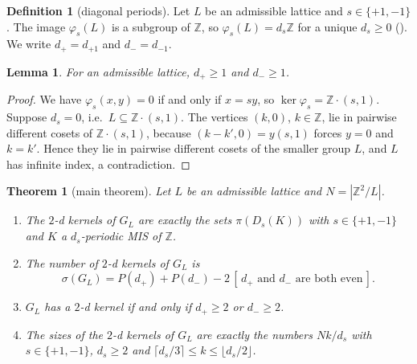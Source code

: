 \documentclass[11pt]{article}
\theoremstyle{plain}
\newtheorem{theorem}{Theorem}[section]
\newtheorem{lemma}[lemma]{Lemma}
\theoremstyle{definition}
\newtheorem{definition}[definition]{Definition}
\theoremstyle{remark}
\newcommand{\Z}{\mathbb{Z}}
\newcommand{\Dg}[2]{D_{#1}(#2)}
\newcommand{\Per}{P}
\newcommand{\Iv}[1]{[\,#1\,]}
\begin{document}
\begin{definition}[diagonal periods]\label{def:periods}
Let $L$ be an admissible lattice and $s \in \{+1,-1\}$. The image $\varphi_s(L)$ is a subgroup
of $\Z$, so $\varphi_s(L) = d_s\Z$ for a unique $d_s \ge 0$ (). We write
$d_{+} = d_{+1}$ and $d_{-} = d_{-1}$.
\end{definition}

\begin{lemma}\label{lem:periods-positive}
For an admissible lattice, $d_{+} \ge 1$ and $d_{-} \ge 1$.
\end{lemma}

\begin{proof}
We have $\varphi_s(x,y) = 0$ if and only if $x = sy$, so $\ker\varphi_s = \Z\cdot(s,1)$.
Suppose $d_s = 0$, i.e.\ $L \subseteq \Z\cdot(s,1)$. The vertices $(k, 0)$, $k \in \Z$, lie in
pairwise different cosets of $\Z\cdot(s,1)$, because $(k - k', 0) = y(s,1)$ forces $y = 0$ and
$k = k'$. Hence they lie in pairwise different cosets of the smaller group $L$, and $L$ has
infinite index, a contradiction.
\end{proof}

\begin{theorem}[main theorem]\label{thm:main}
Let $L$ be an admissible lattice and $N = |\Z^2 / L|$.
\begin{enumerate}[label=(\alph*)]
  \item\label{main-a} The $2$-d kernels of $G_L$ are exactly the sets $\pi(\Dg{s}{K})$ with
        $s \in \{+1,-1\}$ and $K$ a $d_s$-periodic MIS of $\Z$.
  \item\label{main-b} The number of $2$-d kernels of $G_L$ is
        \[
        \sigma(G_L) = \Per(d_{+}) + \Per(d_{-}) - 2\,\Iv{d_{+} \text{ and } d_{-}
        \text{ are both even}} .
        \]
  \item\label{main-c} $G_L$ has a $2$-d kernel if and only if $d_{+} \ge 2$ or
        $d_{-} \ge 2$.
  \item\label{main-d} The sizes of the $2$-d kernels of $G_L$ are exactly the numbers
        $Nk/d_s$ with $s \in \{+1,-1\}$, $d_s \ge 2$ and
        $\lceil d_s/3 \rceil \le k \le \lfloor d_s/2 \rfloor$.
\end{enumerate}
\end{theorem}
\end{document}
